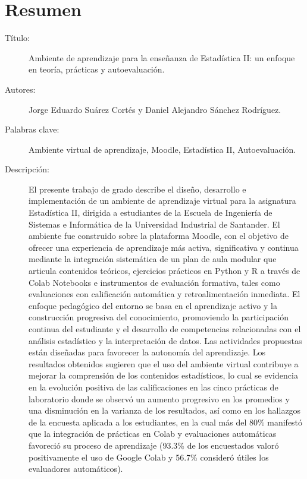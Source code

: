 \documentclass[letter,oneside,12pt,spanish]{report}
\begin{document}
\newpage

\newpage

\chapter*{Resumen}

\footnotesize{
\begin{description}
  \item[Título:] Ambiente de aprendizaje para la enseñanza de Estadística II: un enfoque en teoría, prácticas y autoevaluación.
  \item[Autores:] Jorge Eduardo Suárez Cortés y Daniel Alejandro Sánchez Rodríguez.
  \item[Palabras clave:] Ambiente virtual de aprendizaje, Moodle, Estadística II, Autoevaluación.
  \item[Descripción:] {
    \begin{spacing}{1.6}
    El presente trabajo de grado describe el diseño, desarrollo e implementación de un ambiente de aprendizaje virtual para la asignatura Estadística II, dirigida a estudiantes de la Escuela de Ingeniería de Sistemas e Informática de la Universidad Industrial de Santander. El ambiente fue construido sobre la plataforma Moodle, con el objetivo de ofrecer una experiencia de aprendizaje más activa, significativa y continua mediante la integración sistemática de un plan de aula modular que articula contenidos teóricos, ejercicios prácticos en Python y R a través de Colab Notebooks e instrumentos de evaluación formativa, tales como evaluaciones con calificación automática y retroalimentación inmediata.  
    El enfoque pedagógico del entorno se basa en el aprendizaje activo y la construcción progresiva del conocimiento, promoviendo la participación continua del estudiante y el desarrollo de competencias relacionadas con el análisis estadístico y la interpretación de datos. Las actividades propuestas están diseñadas para favorecer la autonomía del aprendizaje. Los resultados obtenidos sugieren que el uso del ambiente virtual contribuye a mejorar la comprensión de los contenidos estadísticos, lo cual se evidencia en la evolución positiva de las calificaciones en las cinco prácticas de laboratorio donde se observó un aumento progresivo en los promedios y una disminución en la varianza de los resultados, así como en los hallazgos de la encuesta aplicada a los estudiantes, en la cual más del 80\% manifestó que la integración de prácticas en Colab y evaluaciones automáticas favoreció su proceso de aprendizaje (93.3\% de los encuestados valoró positivamente el uso de Google Colab y 56.7\% consideró útiles los evaluadores automáticos).  

\end{spacing}}
\end{description}}
\end{document}
